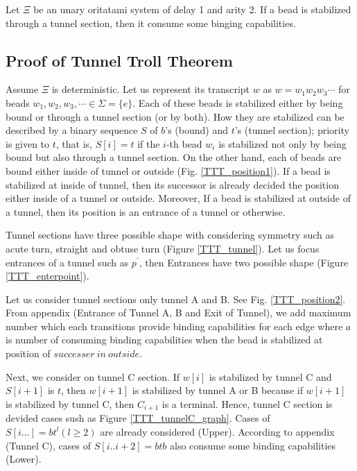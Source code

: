 \documentclass[runningheads]{llncs}
\begin{document}
\begin{theorem}
  Let $\Xi$ be an unary oritatami system of delay 1 and arity 2. If a bead is stabilized through a tunnel section, then it consume some binging capabilities.
\end{theorem}

\subsection{Proof of Tunnel Troll Theorem}
Assume $\Xi$ is deterministic. Let us represent its transcript $w$ as $w = w_1 w_2 w_3 \cdots$ for beads $w_1 , w_2 , w_3 , \cdots \in \Sigma = \{e\}$. Each of these beads is stabilized either by being bound or through a tunnel section (or by both). How they are stabilized can be described by a binary sequence $S$ of $b$'s (bound) and $t$'s (tunnel section); priority is given to $t$, that is, $S[i] = t$ if the $i$-th bead $w_i$ is stabilized not only by being bound but also through a tunnel section. 
On the other hand, each of beads are bound either inside of tunnel or outside (Fig. \ref{TTT_position1}). If a bead is stabilized at inside of tunnel, then its successor is already decided the position either inside of a tunnel or outside. Moreover, If a bead is stabilized at outside of a tunnel, then its position is an entrance of a tunnel or otherwise.


Tunnel sections have three possible shape with considering symmetry such as acute turn, straight and obtuse turn (Figure \ref{TTT_tunnel}). Let us focus entrances of a tunnel such as $p^\prime$, then Entrances have two possible shape (Figure \ref{TTT_enterpoint}).


Let us consider tunnel sections only tunnel A and B. See Fig. \ref{TTT_position2}. From appendix (Entrance of Tunnel A, B and Exit of Tunnel), we add maximum number which each transitions provide binding capabilities for each edge where $a$ is number of consuming binding capabilities when the bead is stabilized at position of $successer\ in\ outside$.


Next, we consider on tunnel C section. If $w[i]$ is stabilized by tunnel C and $S[i+1]$ is $t$, then $w[i+1]$ is stabilized by tunnel A or B because if $w[i+1]$ is stabilized by tunnel C, then $C_{i+1}$ is a terminal. Hence, tunnel C section is devided cases sush as Figure \ref{TTT_tunnelC_graph}. Cases of $S[i...] = bt^l (l \geq 2)$ are already considered (Upper). According to appendix (Tunnel C), cases of $S[i..i+2] = btb$ also consume some binding capabilities (Lower).
\end{document}

